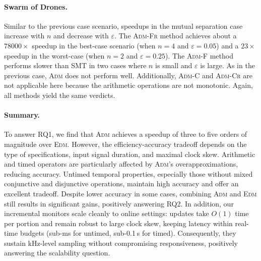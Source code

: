 \paragraph*{Swarm of Drones.}
Similar to the previous case scenario, speedups in the mutual separation case increase with \(n\) and decrease with \(\varepsilon\).
The \textsc{Adm-Fr} method achieves about a $78000\times$ speedup in the best-case scenario (when \(n=4\) and \(\varepsilon=0.05\)) and a $23\times$ speedup in the worst-case (when \(n=2\) and \(\varepsilon=0.25\)).
The \textsc{Adm-F} method performs slower than SMT in two cases where \(n\) is small and \(\varepsilon\) is large.
%
As in the previous case, \textsc{Adm} does not perform well.
Additionally, \textsc{Adm-C} and \textsc{Adm-Cr} are not applicable here because the arithmetic operations are not monotonic.
Again, all methods yield the same verdicts.

\paragraph*{Summary.}
To answer RQ1, we find that \textsc{Adm} achieves a speedup of three to five orders of magnitude over \textsc{Edm}. However, the efficiency-accuracy tradeoff depends on the type of specifications, input signal duration, and maximal clock skew. Arithmetic and timed operators are particularly affected by \textsc{Adm}'s overapproximations, reducing accuracy. Untimed temporal properties, especially those without mixed conjunctive and disjunctive operations, maintain high accuracy and offer an excellent tradeoff. Despite lower accuracy in some cases, combining \textsc{Adm} and \textsc{Edm} still results in significant gains, positively answering RQ2.
In addition, our incremental monitors scale cleanly to online settings: updates take $O(1)$ time per portion and remain robust to large clock skew, keeping latency within real-time budgets (sub-ms for untimed, sub-0.1 s for timed). Consequently, they sustain kHz-level sampling without compromising responsiveness, positively answering the scalability question.

